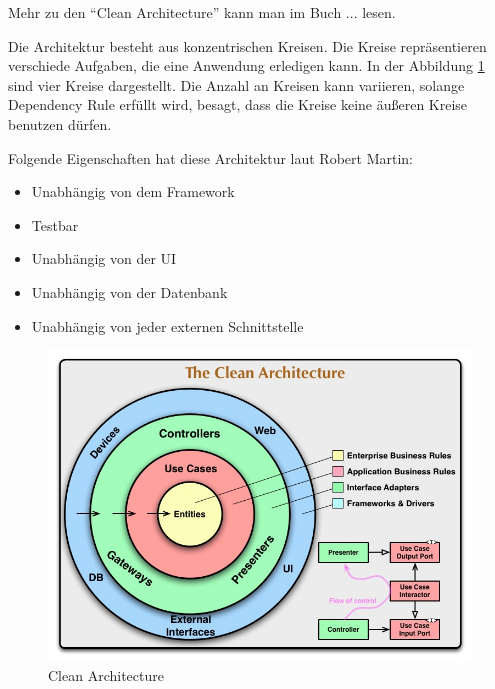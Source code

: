 Mehr zu den ``Clean Architecture'' kann man im Buch ... lesen.

Die Architektur besteht aus konzentrischen Kreisen. Die Kreise repräsentieren verschiede Aufgaben, die eine Anwendung erledigen kann.
In der Abbildung \ref{fig:Clean Architecture} sind vier Kreise dargestellt. Die Anzahl an Kreisen kann variieren,
solange Dependency Rule erfüllt wird, besagt, 
dass die Kreise keine äußeren Kreise benutzen dürfen.

Folgende Eigenschaften hat diese Architektur laut Robert Martin:
\begin{itemize}
    \item Unabhängig von dem Framework
    \item Testbar
    \item Unabhängig von der UI
    \item Unabhängig von der Datenbank
    \item Unabhängig von jeder externen Schnittstelle
\end{itemize}

\begin{figure}[H]
    \centering
    \includegraphics[width=1\textwidth]{./images/CleanArchitecture.jpg}
    \caption[Clean Architecture]{Clean Architecture \footnotemark}
    \label{fig:Clean Architecture}
\end{figure}

